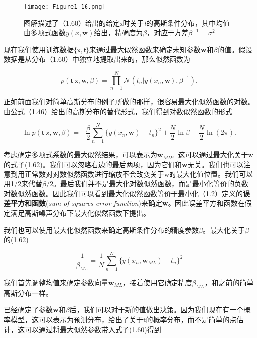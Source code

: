 	\begin{figure}[t]
		\parbox{.4\textwidth}{\caption{  图解描述了（1.60）给出的给定\textit{x}时关于\textit{t}的高斯条件分布，其中均值由多项式函数$y(x, \textbf{w})$给出，精确度为$\beta$，对应于方差$\beta^{-1} = \sigma^2$ }}
		\parbox{.5\textwidth}{\texttt{[image: Figure1-16.png]}}
	\end{figure}
	
	现在我们使用训练数据$\{ \mathsf{x, t} \}$来通过最大似然函数来确定未知参数\textbf{w}和$\beta$的值。假设数据是从分布（1.60）中独立地提取出来的，那么似然函数为
	
	\begin{equation}
	p(\mathsf{t|x}, \textbf{w}, \beta) = \prod_{n = 1}^{N} \mathcal{N}(t_n| y(x_n, \textbf{w}), \beta^{-1}).
	\end{equation}
	
	正如前面我们对简单高斯分布的例子所做的那样，很容易最大化似然函数的对数。由公式（1.46）给出的高斯分布的替代形式，我们得到对数似然函数的形式
	
	\begin{equation}
	\ln p(\mathsf{t|x}, \textbf{w}, \beta) = -\frac{\beta}{2} \sum_{n = 1}^{N} \{ y(x_n, \textbf{w}) - t_n \}^2 + \frac{N}{2}\ln \beta - \frac{N}{2} \ln (2 \pi).
	\end{equation}
	
	考虑确定多项式系数的最大似然结果，可以表示为$\textbf{w}_{ML}$。这可以通过最大化关于w的式子(1.62)。我们可以忽略右边的最后两项，因为它们和\textbf{w}无关。我们也可以注意到用正常数对对数似然函数进行缩放不会改变关于w的最大化值位置。我们可以用1/2来代替$\beta/2$。最后我们并不是最大化对数似然函数，而是最小化等价的负数对数似然函数。因此我们可以看到最大化似然函数等价于最小化（1.2）定义的\textbf{误差平方和函数}(\textit{sum-of-squares error function})来确定\textbf{w}。因此误差平方和函数在假定满足高斯噪声分布下最大化似然函数下提出。
	
	我们也可以使用最大化似然函数来确定高斯条件分布的精度参数$\beta$。最大化关于$\beta$的(1.62)
	
	\begin{equation}
	\frac{1}{\beta_{ML}} = \frac{1}{N} \sum_{n = 1}^{N}\{ y(x_n, \textbf{w}_{ML}) - t_n \}^2
	\end{equation}

	我们首先调整均值来确定参数向量$\textbf{w}_{ML}$，接着使用它确定精度$\beta_{ML}$，和之前的简单高斯分布一样。
	
	已经确定了参数\textbf{w}和$\beta$后，我们可以对于新的值做出决策。因为我们现在有一个概率模型，这可以表示为预测分布，给出了关于t的概率分布，而不是简单的点估计，这可以通过将最大似然参数带入式子(1.60)得到
	
